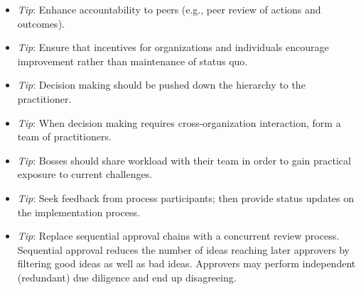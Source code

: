 \begin{itemize}
\item \textit{Tip}: Enhance accountability to peers (e.g., peer review of actions and outcomes).
\item \textit{Tip}: Ensure that incentives for organizations and individuals encourage improvement rather than maintenance of status quo.
\item \textit{Tip}: Decision making should be pushed down the hierarchy to the practitioner.
\item \textit{Tip}: When decision making requires cross-organization interaction, form a team of practitioners.
\item \textit{Tip}: Bosses should share workload with their team in order to gain practical exposure to current challenges.
\item \textit{Tip}: Seek feedback from process participants; then provide status updates on the implementation process.

\item \textit{Tip}: Replace sequential approval chains with a concurrent review process. Sequential approval reduces the number of ideas reaching later approvers by filtering good ideas as well as bad ideas. Approvers may perform independent (redundant) due diligence and end up disagreeing. 
\end{itemize}
